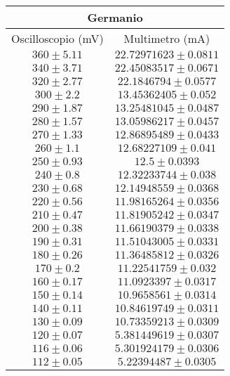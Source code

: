 \documentclass[@SRC@/main]{subfiles}
\begin{document}
\begin{center}
  \begin{tabular}{ ||c|c|| }
  \hline
  \multicolumn{2}{||c||}{Germanio}\\
  \hline
  Oscilloscopio (mV) & Multimetro (mA) \\
  \hline
  $360\pm 5.11$ & $22.72971623\pm 0.0811$ \\
  \hline
  $340\pm 3.71$ & $22.45083517\pm 0.0671$ \\
  \hline
  $320\pm 2.77$ & $22.1846794\pm 0.0577$ \\
  \hline
  $300\pm 2.2$ & $13.45362405\pm 0.052$\\
  \hline
   $290\pm 1.87$ & $13.25481045\pm 0.0487$ \\
  \hline
   $280\pm 1.57$ & $13.05986217\pm 0.0457$ \\
  \hline
   $270\pm 1.33$  & $12.86895489\pm 0.0433$ \\
  \hline
   $260\pm 1.1$ & $12.68227109\pm 0.041$ \\
  \hline
  $250\pm 0.93$ & $12.5\pm 0.0393$ \\
  \hline
   $240\pm 0.8$ & $12.32233744\pm 0.038$ \\
  \hline
  $230\pm 0.68$ & $12.14948559\pm 0.0368$ \\
  \hline 
  $220\pm 0.56$ & $11.98165264\pm 0.0356$ \\
  \hline 
  $210\pm 0.47$ & $11.81905242\pm 0. 0347$ \\
  \hline 
  $200\pm 0.38$ & $11.66190379\pm 0.0338$ \\
  \hline 
  $190\pm 0.31$ & $11.51043005\pm 0.0331$ \\
  \hline 
  $180\pm 0.26$ & $11.36485812\pm 0.0326$ \\
  \hline 
  $170\pm 0.2$ & $11.22541759\pm 0.032$ \\
  \hline 
  $160\pm 0.17 $ & $11.0923397\pm 0.0317$ \\
  \hline 
  $150\pm 0.14 $ & $10.9658561\pm 0.0314$ \\
  \hline 
  $140\pm 0.11 $ & $10.84619749\pm 0.0311$ \\
  \hline 
  $130\pm 0.09 $ & $10.73359213\pm 0.0309$ \\
  \hline 
  $120\pm 0.07 $ & $5.381449619\pm 0.0307$ \\
  \hline 
  $116\pm 0.06 $ & $5.301924179\pm 0.0306$ \\
  \hline 
  $112\pm 0.05 $ & $5.22394487\pm 0.0305$ \\
  \hline 
 
  \end{tabular}   
 \end{center}
\end{document}
